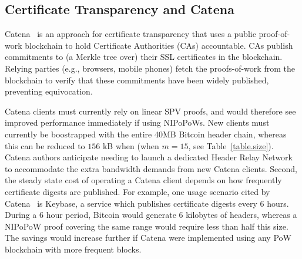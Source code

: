 \subsection{Certificate Transparency and Catena}
\label{sec.catena}
Catena~\cite{catena} is an approach for certificate transparency that uses a public proof-of-work blockchain to hold Certificate Authorities (CAs) accountable.
CAs publish commitments to (a Merkle tree over) their SSL certificates in the blockchain. 
Relying parties (e.g., browsers, mobile phones) fetch the proofs-of-work from the blockchain to verify that these commitments have been widely published, preventing equivocation.

Catena clients must currently rely on linear SPV proofs, and would therefore see improved performance immediately if using NIPoPoWs. New clients must currently be boostrapped with the entire 40MB Bitcoin header chain, whereas this can be reduced to $156$ kB when (when $m=15$, see Table~\ref{table.size}).
Catena authors anticipate needing to launch a dedicated
Header Relay Network~\cite{catena} to accommodate the extra bandwidth demands
from new Catena clients.
 Second, the steady state cost of operating a Catena client depends
on how frequently certificate digests are published. For example, one usage
scenario cited by Catena~\cite{catena} is Keybase, a service which publishes
certificate digests every 6 hours. During a 6 hour period, Bitcoin would
generate 6 kilobytes of headers, whereas a NIPoPoW proof covering the same range
would require less than half this size. The savings would increase further if
Catena were implemented using any PoW blockchain with more frequent blocks.
